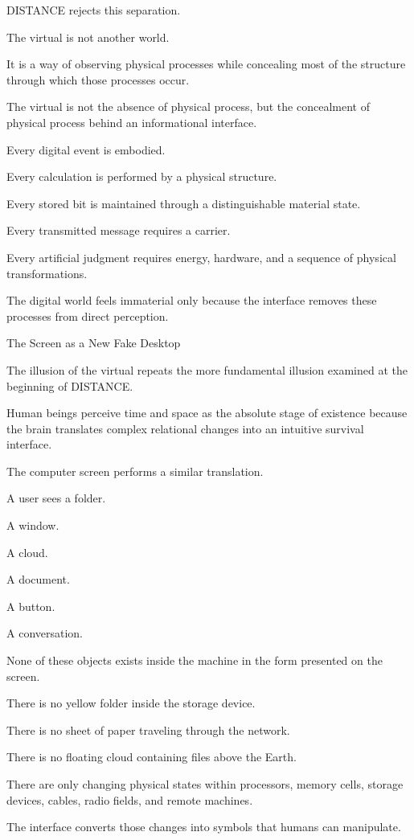 DISTANCE rejects this separation.

The virtual is not another world.

It is a way of observing physical processes while concealing most of the structure through which those processes occur.

The virtual is not the absence of physical process, but the concealment of physical process behind an informational interface.

Every digital event is embodied.

Every calculation is performed by a physical structure.

Every stored bit is maintained through a distinguishable material state.

Every transmitted message requires a carrier.

Every artificial judgment requires energy, hardware, and a sequence of physical transformations.

The digital world feels immaterial only because the interface removes these processes from direct perception.

The Screen as a New Fake Desktop

The illusion of the virtual repeats the more fundamental illusion examined at the beginning of DISTANCE.

Human beings perceive time and space as the absolute stage of existence because the brain translates complex relational changes into an intuitive survival interface.

The computer screen performs a similar translation.

A user sees a folder.

A window.

A cloud.

A document.

A button.

A conversation.

None of these objects exists inside the machine in the form presented on the screen.

There is no yellow folder inside the storage device.

There is no sheet of paper traveling through the network.

There is no floating cloud containing files above the Earth.

There are only changing physical states within processors, memory cells, storage devices, cables, radio fields, and remote machines.

The interface converts those changes into symbols that humans can manipulate.

